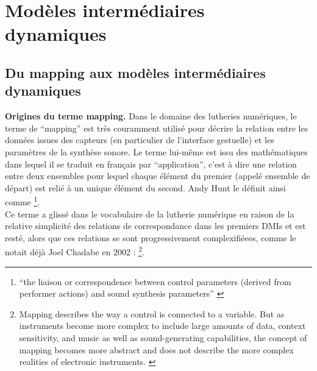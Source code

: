 \section{Modèles intermédiaires dynamiques}
\label{sec:algorithms:MID}

\subsection{Du mapping aux modèles intermédiaires dynamiques}
\label{sec:algorithms:MID:mapping-to-MID}

\par{\textbf{Origines du terme mapping.}} Dans le domaine des lutheries numériques, le terme de ``mapping'' est très couramment utilisé pour décrire la relation entre les données issues des capteurs (en particulier de l'interface gestuelle) et les paramètres de la synthèse sonore. Le terme lui-même est issu des mathématiques dans lequel il se traduit en français par ``application'', c'est à dire une relation entre deux ensembles pour lequel chaque élément du premier (appelé ensemble de départ) est relié à un unique élément du second. Andy Hunt le définit ainsi comme \footnote{``the liaison or correspondence between control parameters (derived from performer actions) and sound synthesis parameters'' \cite{hunt_towards_2000}}.\\
\indent Ce terme a glissé dans le vocabulaire de la lutherie numérique en raison de la relative simplicité des relations de correspondance dans les premiers \glspl{DMI} et est resté, alors que ces relations se sont progressivement complexifiéees, comme le notait déjà Joel Chadabe en 2002 : \footnote{Mapping describes the way a control is connected to a variable. But as instruments become more complex to include large amounts of data, context sensitivity, and music as well as sound-generating capabilities, the concept of mapping becomes more abstract and does not describe the more complex realities of electronic instruments. \cite{chadabe_limitations_2002}}.

